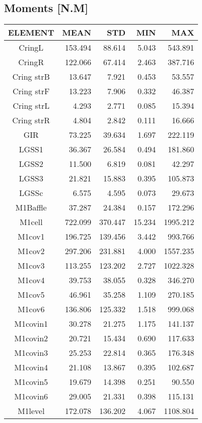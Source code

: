 \subsection{Moments [N.M]}
\begin{longtable}{crrrr}\toprule
 ELEMENT & MEAN & STD & MIN & MAX \\\hline
 CringL & 153.494 & 88.614 & 5.043 & 543.891 \\
 CringR & 122.066 & 67.414 & 2.463 & 387.716 \\
 Cring strB & 13.647 & 7.921 & 0.453 & 53.557 \\
 Cring strF & 13.223 & 7.906 & 0.332 & 46.387 \\
 Cring strL & 4.293 & 2.771 & 0.085 & 15.394 \\
 Cring strR & 4.804 & 2.842 & 0.111 & 16.666 \\
 GIR & 73.225 & 39.634 & 1.697 & 222.119 \\
 LGSS1 & 36.367 & 26.584 & 0.494 & 181.860 \\
 LGSS2 & 11.500 & 6.819 & 0.081 & 42.297 \\
 LGSS3 & 21.821 & 15.883 & 0.395 & 105.873 \\
 LGSSc & 6.575 & 4.595 & 0.073 & 29.673 \\
 M1Baffle & 37.287 & 24.384 & 0.157 & 172.296 \\
 M1cell & 722.099 & 370.447 & 15.234 & 1995.212 \\
 M1cov1 & 196.725 & 139.456 & 3.442 & 993.766 \\
 M1cov2 & 297.206 & 231.881 & 4.000 & 1557.235 \\
 M1cov3 & 113.255 & 123.202 & 2.727 & 1022.328 \\
 M1cov4 & 39.753 & 38.055 & 0.328 & 346.270 \\
 M1cov5 & 46.961 & 35.258 & 1.109 & 270.185 \\
 M1cov6 & 136.806 & 125.332 & 1.518 & 999.068 \\
 M1covin1 & 30.278 & 21.275 & 1.175 & 141.137 \\
 M1covin2 & 20.721 & 15.434 & 0.690 & 117.633 \\
 M1covin3 & 25.253 & 22.814 & 0.365 & 176.348 \\
 M1covin4 & 21.108 & 13.867 & 0.395 & 102.687 \\
 M1covin5 & 19.679 & 14.398 & 0.251 & 90.550 \\
 M1covin6 & 29.005 & 21.331 & 0.398 & 115.131 \\
 M1level & 172.078 & 136.202 & 4.067 & 1108.804 \\

\end{longtable}
